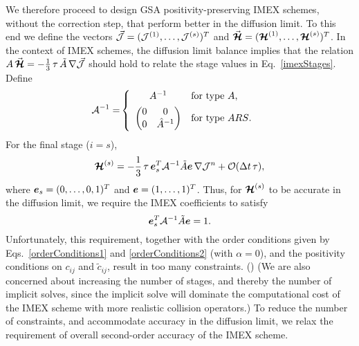 We therefore proceed to design GSA positivity-preserving IMEX schemes, without the correction step, that perform better in the diffusion limit.  
To this end we define the vectors $\vec{\mathcal{J}}=(\mathcal{J}^{(1)},\ldots,\mathcal{J}^{(s)})^{T}$ and $\vec{\boldsymbol{\mathcal{H}}}=(\boldsymbol{\mathcal{H}}^{(1)},\ldots,\boldsymbol{\mathcal{H}}^{(s)})^{T}$.  
In the context of IMEX schemes, the diffusion limit balance implies that the relation $A\,\vec{\boldsymbol{\mathcal{H}}}=-\frac{1}{3}\,\tau\,\tilde{A}\,\nabla\vec{\mathcal{J}}$ should hold to relate the stage values in Eq.~\eqref{imexStages}.  
Define
\begin{align*}
    \mathcal{A}^{-1}
    =&\left\{
      \begin{array}{cl}
       A^{-1} & \text{for type $A$,} \vspace{4pt} \\ 
       \left( 
          \begin{matrix} 
              0 & 0 \\ 
              0 & \hat{A}^{-1}
          \end{matrix}
       \right)  & \text{for type $ARS$.}
      \end{array}
      \right.
\end{align*}
For the final stage ($i=s$), 
\begin{equation}
  \boldsymbol{\mathcal{H}}^{(s)}=-\frac{1}{3}\,\tau\,\boldsymbol{e}_{s}^{T}\mathcal{A}^{-1}\tilde{A}\boldsymbol{e}\,\nabla\mathcal{J}^{n}+\mathcal{O}(\Delta t\,\tau),
\end{equation}
where $\boldsymbol{e}_{s}=(0,\ldots,0,1)^{T}$ and $\boldsymbol{e}=(1,\ldots,1)^{T}$.  
Thus, for $\boldsymbol{\mathcal{H}}^{(s)}$ to be accurate in the diffusion limit, we require the IMEX coefficients to satisfy
\begin{equation}
  \boldsymbol{e}_{s}^{T}\mathcal{A}^{-1}\tilde{A}\boldsymbol{e} = 1.
  \label{eq:diffusionCondition}
\end{equation}
Unfortunately, this requirement, together with the order conditions given by Eqs.~\eqref{orderConditions1} and \eqref{orderConditions2} (with $\alpha=0$), and the positivity conditions on $c_{ij}$ and $\tilde{c}_{ij}$, result in too many constraints.  
()
(We are also concerned about increasing the number of stages, and thereby the number of implicit solves, since the implicit solve will dominate the computational cost of the IMEX scheme with more realistic collision operators.)
To reduce the number of constraints, and accommodate accuracy in the diffusion limit, we relax the requirement of overall second-order accuracy of the IMEX scheme.  
